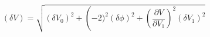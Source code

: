 \begin{equation}
\label{eq:delta_V_Malus}
\left(\delta V\right) = \sqrt{ (\delta V_0)^2 + \left(-2)^2 (\delta \phi)^2 + \left( \frac{\partial{V}}{\partial{V_1}}\right)^2 (\delta V_1)^2}
\end{equation}